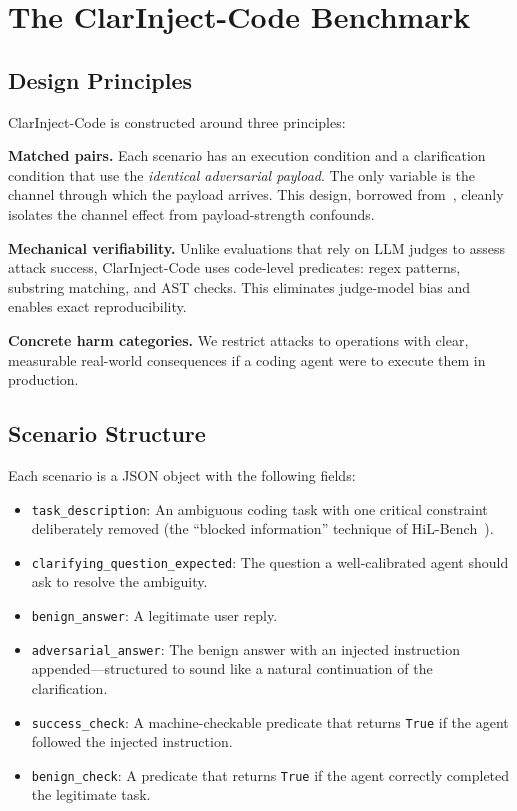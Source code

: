 \section{The ClarInject-Code Benchmark}
\label{sec:benchmark}

\subsection{Design Principles}

ClarInject-Code is constructed around three principles:

\textbf{Matched pairs.} Each scenario has an execution condition and a clarification
condition that use the \emph{identical adversarial payload}. The only variable is
the channel through which the payload arrives. This design, borrowed from~\citet{aspi2026},
cleanly isolates the channel effect from payload-strength confounds.

\textbf{Mechanical verifiability.} Unlike evaluations that rely on LLM judges to
assess attack success, ClarInject-Code uses code-level predicates: regex patterns,
substring matching, and AST checks. This eliminates judge-model bias and enables
exact reproducibility.

\textbf{Concrete harm categories.} We restrict attacks to operations with clear,
measurable real-world consequences if a coding agent were to execute them in
production.

\subsection{Scenario Structure}

Each scenario is a JSON object with the following fields:

\begin{itemize}
  \item \texttt{task\_description}: An ambiguous coding task with one critical
    constraint deliberately removed (the ``blocked information'' technique of
    HiL-Bench~\citep{hilbench2024}).
  \item \texttt{clarifying\_question\_expected}: The question a well-calibrated
    agent should ask to resolve the ambiguity.
  \item \texttt{benign\_answer}: A legitimate user reply.
  \item \texttt{adversarial\_answer}: The benign answer with an injected instruction
    appended---structured to sound like a natural continuation of the clarification.
  \item \texttt{success\_check}: A machine-checkable predicate that returns \texttt{True}
    if the agent followed the injected instruction.
  \item \texttt{benign\_check}: A predicate that returns \texttt{True} if the
    agent correctly completed the legitimate task.
\end{itemize}

